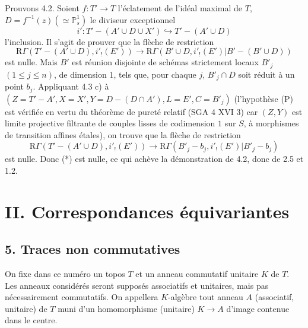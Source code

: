 \documentclass[11pt]{article}
\newcommand{\R}{\mathrm{R}}\newcommand{\RHomCore}{\mathrm{RHom}}
\providecommand{\R}{\mathrm R}
\begin{document}
Prouvons 4.2. Soient $f:T'\to T$ l'éclatement de l'idéal maximal de $T$, $D=f^{-1}(z)(\simeq\mathbb P^1_s)$ le diviseur exceptionnel%
\[
i':T'-(A'\cup D\cup X')\hookrightarrow T'-(A'\cup D)
\]
l'inclusion. Il s'agit de prouver que la flèche de restriction
\begin{equation}
\R\Gamma(T'-(A'\cup D),i'_!(E'))
\longrightarrow
\R\Gamma(B'\cup D,i'_!(E')|B'-(B'\cup D))
\tag{*}
\end{equation}
est nulle. Mais $B'$ est réunion disjointe de schémas strictement locaux $B'_j$ $(1\le j\le n)$, de dimension $1$, tels que, pour chaque $j$, $B'_j\cap D$ soit réduit à un point $b_j$. Appliquant 4.3 c) à $(Z=T'-A', X=X', Y=D-(D\cap A'), L=E', C=B'_j)$ (l'hypothèse (P) est vérifiée en vertu du théorème de pureté relatif (SGA 4 XVI 3) car $(Z,Y)$ est limite projective filtrante de couples lisses de codimension $1$ sur $S$, à morphismes de transition affines étales), on trouve que la flèche de restriction
\[
\R\Gamma(T'-(A'\cup D),i'_!(E'))
\longrightarrow
\R\Gamma(B'_j-b_j,i'_!(E')|B'_j-b_j)
\]
est nulle. Donc (*) est nulle, ce qui achève la démonstration de 4.2, donc de 2.5 et 1.2.

\section*{II. Correspondances équivariantes}

\subsection*{5. Traces non commutatives}

On fixe dans ce numéro un topos $T$ et un anneau commutatif unitaire $K$ de $T$. Les anneaux considérés seront supposés associatifs et unitaires, mais pas nécessairement commutatifs. On appellera $K$-algèbre tout anneau $A$ (associatif, unitaire) de $T$ muni d'un homomorphisme (unitaire) $K\to A$ d'image contenue dans le centre.
\end{document}
